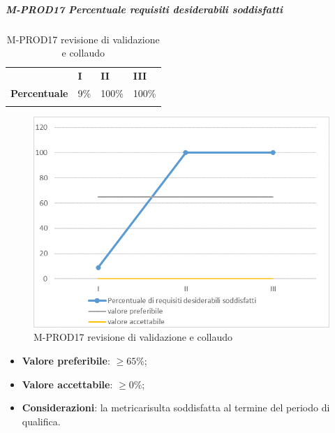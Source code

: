 \subparagraph{M-PROD17 Percentuale requisiti desiderabili soddisfatti} \mbox{}
\begin{longtable}[H!] {						
		>{}p{50mm}  		
		>{}p{8mm}
		>{}p{8mm}		
		>{}p{8mm}		
	}
	\rowcolor{gray!50}
	\textbf{} & \textbf{I} & \textbf{II} & \textbf{III} \TBstrut \\ [2mm]
	\textbf{Percentuale} & 9\% & 100\% & 100\%  \TBstrut \\ [2mm]
	\rowcolor{white}
	\caption{M-PROD17 revisione di validazione e collaudo}
\end{longtable}
\begin{figure}[H] 	
	\includegraphics[width=\linewidth]{./img/grafici/RA17.png}	
	\caption{M-PROD17 revisione di validazione e collaudo}	
\end{figure}
\begin{itemize}
	\item \textbf{Valore preferibile}: $\ge 65\%$;
	\item \textbf{Valore accettabile}: $\ge 0\%$;
	\item \textbf{Considerazioni}: la metrica\glosp risulta soddisfatta al termine del periodo di qualifica.
\end{itemize}

